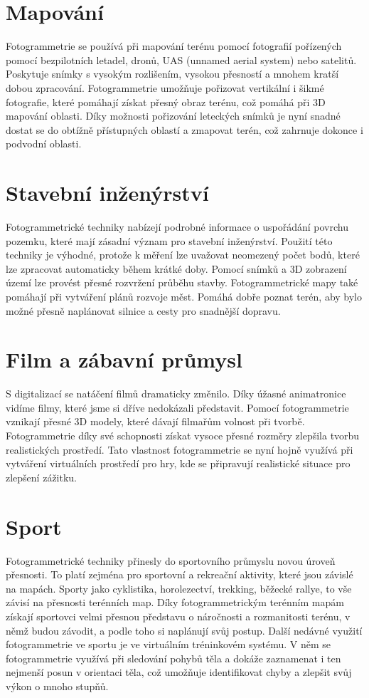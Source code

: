 \documentclass[12pt]{report}			%
\begin{document}
            \section{Mapování}
            Fotogrammetrie se používá při mapování terénu pomocí fotografií pořízených pomocí bezpilotních letadel, dronů, UAS (unnamed aerial system) nebo satelitů. Poskytuje snímky s vysokým rozlišením, vysokou přesností a mnohem kratší dobou zpracování. Fotogrammetrie umožňuje pořizovat vertikální i šikmé fotografie, které pomáhají získat přesný obraz terénu, což pomáhá při 3D mapování oblasti. Díky možnosti pořizování leteckých snímků je nyní snadné dostat se do obtížně přístupných oblastí a zmapovat terén, což zahrnuje dokonce i podvodní oblasti.
            \section{Stavební inženýrství}
            Fotogrammetrické techniky nabízejí podrobné informace o uspořádání povrchu pozemku, které mají zásadní význam pro stavební inženýrství. Použití této techniky je výhodné, protože k měření lze uvažovat neomezený počet bodů, které lze zpracovat automaticky během krátké doby. Pomocí snímků a 3D zobrazení území lze provést přesné rozvržení průběhu stavby.  Fotogrammetrické mapy také pomáhají při vytváření plánů rozvoje měst. Pomáhá dobře poznat terén, aby bylo možné přesně naplánovat silnice a cesty pro snadnější dopravu.
            \section{Film a zábavní průmysl}
            S digitalizací se natáčení filmů dramaticky změnilo. Díky úžasné animatronice vidíme filmy, které jsme si dříve nedokázali představit. Pomocí fotogrammetrie vznikají přesné 3D modely, které dávají filmařům volnost při tvorbě. Fotogrammetrie díky své schopnosti získat vysoce přesné rozměry zlepšila tvorbu realistických prostředí. Tato vlastnost fotogrammetrie se nyní hojně využívá při vytváření virtuálních prostředí pro hry, kde se připravují realistické situace pro zlepšení zážitku.
            \section{Sport}
            Fotogrammetrické techniky přinesly do sportovního průmyslu novou úroveň přesnosti. To platí zejména pro sportovní a rekreační aktivity, které jsou závislé na mapách. Sporty jako cyklistika, horolezectví, trekking, běžecké rallye, to vše závisí na přesnosti terénních map. Díky fotogrammetrickým terénním mapám získají sportovci velmi přesnou představu o náročnosti a rozmanitosti terénu, v němž budou závodit, a podle toho si naplánují svůj postup. Další nedávné využití fotogrammetrie ve sportu je ve virtuálním tréninkovém systému. V něm se fotogrammetrie využívá při sledování pohybů těla a dokáže zaznamenat i ten nejmenší posun v orientaci těla, což umožňuje identifikovat chyby a zlepšit svůj výkon o mnoho stupňů.
\end{document}
